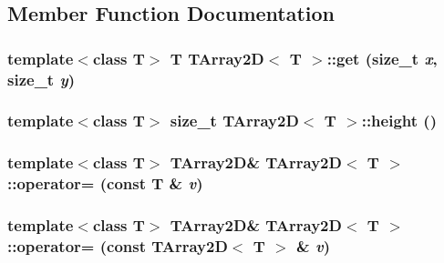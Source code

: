 \subsection{Member Function Documentation}
\hypertarget{classTArray2D_aa1553819f109c409fd8c221c40851b9f}{
\subsubsection[{get}]{\setlength{\rightskip}{0pt plus 5cm}template$<$class T$>$ T {\bf TArray2D}$<$ T $>$::get (size\_\-t {\em x}, \/  size\_\-t {\em y})}}
\label{classTArray2D_aa1553819f109c409fd8c221c40851b9f}
\hypertarget{classTArray2D_affa64168cd2a61534974fbe2fa7ba5a8}{
\subsubsection[{height}]{\setlength{\rightskip}{0pt plus 5cm}template$<$class T$>$ size\_\-t {\bf TArray2D}$<$ T $>$::height ()}}
\label{classTArray2D_affa64168cd2a61534974fbe2fa7ba5a8}
\hypertarget{classTArray2D_a5a320ff3b9af4cf716d53c238f01baf4}{
\subsubsection[{operator=}]{\setlength{\rightskip}{0pt plus 5cm}template$<$class T$>$ {\bf TArray2D}\& {\bf TArray2D}$<$ T $>$::operator= (const T \& {\em v})}}
\label{classTArray2D_a5a320ff3b9af4cf716d53c238f01baf4}
\hypertarget{classTArray2D_adc97abfe0160c0377fd391f73cf7cb16}{
\subsubsection[{operator=}]{\setlength{\rightskip}{0pt plus 5cm}template$<$class T$>$ {\bf TArray2D}\& {\bf TArray2D}$<$ T $>$::operator= (const {\bf TArray2D}$<$ T $>$ \& {\em v})}}
